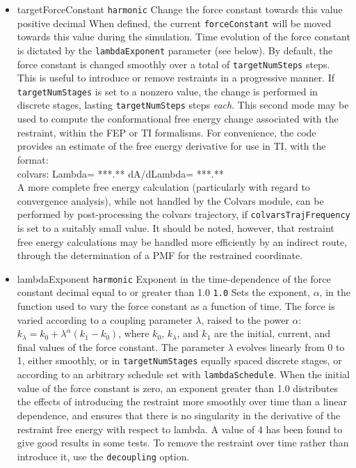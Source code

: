 \begin{itemize}

\item %
  \key
    {targetForceConstant}{%
    \texttt{harmonic}}{%
    Change the force constant towards this value}{%
    positive decimal}{%
    When defined, the current \texttt{forceConstant} will be moved towards
    this value during the simulation. Time evolution of the force constant
    is dictated by the \texttt{lambdaExponent} parameter (see below).
    By default, the force constant is changed smoothly over a total of
    \texttt{targetNumSteps} steps. This is useful to introduce or
    remove restraints in a progressive manner.
    If \texttt{targetNumStages} is set to a nonzero value, the
    change is performed in discrete stages, lasting \texttt{targetNumSteps}
    steps \emph{each}. This second mode may be used to compute the
    conformational free energy change associated with the restraint, within
    the FEP or TI formalisms. For convenience, the code provides an estimate
    of the free energy derivative for use in TI, with the format:\\
    {\ttfamily{}colvars:   Lambda= ***.** dA/dLambda= ***.**}\\
     A more complete free energy
    calculation (particularly with regard to convergence analysis),
    while not handled by the Colvars module, can be performed by post-processing
    the colvars trajectory, if \texttt{colvarsTrajFrequency} is set to a
    suitably small value. It should be noted, however, that restraint
    free energy calculations may be handled more efficiently by an
    indirect route, through the
    determination of a PMF for the restrained coordinate.\cite{Deng2009}}

\item %
  \keydef
    {lambdaExponent}{%
      \texttt{harmonic}}{%
      Exponent in the time-dependence of the force constant}{%
      decimal equal to or greater than 1.0}{%
    \texttt{1.0}}{%
    Sets the exponent, $\alpha$, in the function used to vary the force
    constant as a function of time. The force is varied according to a
    coupling parameter $\lambda$, raised to the power $\alpha$:
    $ k_\lambda = k_0 + \lambda^\alpha (k_1 - k_0)$, where $k_0$,
    $k_\lambda$, and $k_1$ are the initial, current, and final values
    of the force constant. The parameter $\lambda$ evolves linearly from
    0 to 1, either smoothly, or in \texttt{targetNumStages} equally spaced
    discrete stages, or according to an arbitrary schedule set with
    \texttt{lambdaSchedule}.
    When the initial value of the force constant is zero,
    an exponent greater than 1.0 distributes the effects of introducing the
    restraint more smoothly over time than a linear dependence, and
    ensures that there is no singularity in the derivative of the
    restraint free energy with respect to lambda. A value of 4 has
    been found to give good results in some tests.
    To remove the restraint over time rather than introduce it, use the
    \texttt{decoupling} option.}


\end{itemize}
